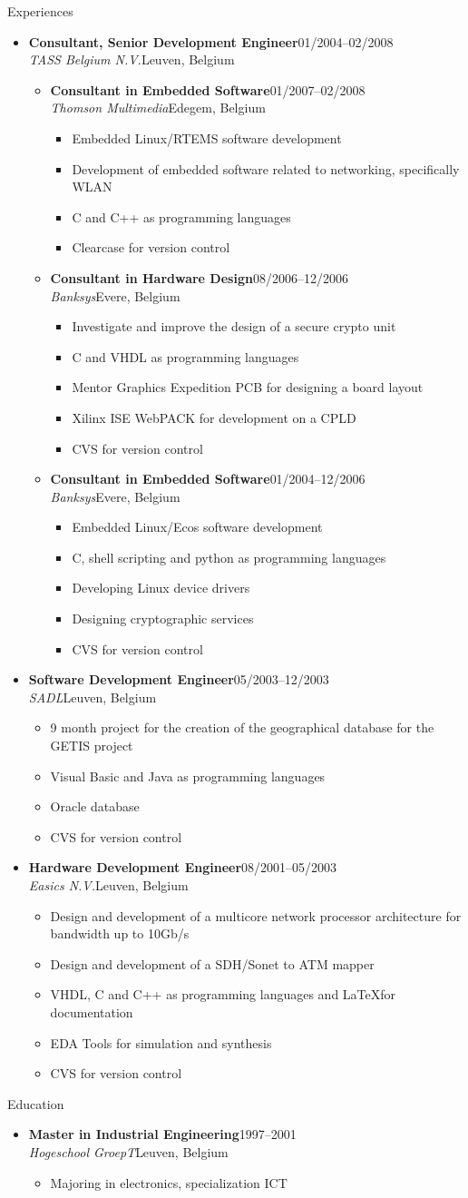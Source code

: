 \documentclass[12pt,oneside]{article}
\newenvironment{ressection}[1]{
	\vspace{5pt}
	{\selectfont\Large#1}
	\begin{itemize}
	\vspace{5pt}
}{
	\end{itemize}
}
\newcommand{\ressubitem}[1]{
	\vspace{-4pt}
	\item \begin{flushleft} #1 \end{flushleft}
}
\newcommand{\resbigitem}[4]{
	\vspace{-5pt}
	\item
	\textbf{#1}\hfill#4 \\
	\textit{#2}\hfill#3
}
\newenvironment{ressubsec}[4]{
	\resbigitem{#1}{#2}{#3}{#4}
	\vspace{-2pt}
	\begin{itemize}
}{
	\end{itemize}
}
\newenvironment{ressubsubsec}[4]{
	\vspace{5pt}
	\resbigitem{#1}{#2}{#3}{#4}
	\begin{itemize}
}{
	\end{itemize}
}
\newcommand{\ressubsubitem}[1]{
	\vspace{-1pt}
	\item \begin{flushleft} #1 \end{flushleft}
}
\begin{document}
\begin{ressection}{Experiences}
\begin{ressubsec}{Consultant, Senior Development Engineer}{TASS Belgium N.V.}{Leuven, Belgium}{01/2004--02/2008}
		\begin{ressubsubsec}{Consultant in Embedded Software}{Thomson Multimedia}{Edegem, Belgium}{01/2007--02/2008}
			\ressubsubitem{Embedded Linux/RTEMS software development}
			\ressubsubitem{Development of embedded software related to networking, specifically WLAN}
			\ressubsubitem{C and C++ as programming languages}
			\ressubsubitem{Clearcase for version control}
		\end{ressubsubsec}
		\begin{ressubsubsec}{Consultant in Hardware Design}{Banksys}{Evere, Belgium}{08/2006--12/2006}
			\ressubsubitem{Investigate and improve the design of a secure crypto unit}
			\ressubsubitem{C and VHDL as programming languages}
			\ressubsubitem{Mentor Graphics Expedition PCB for designing a board layout}
			\ressubsubitem{Xilinx ISE WebPACK for development on a CPLD}
			\ressubsubitem{CVS for version control}
		\end{ressubsubsec}
		\begin{ressubsubsec}{Consultant in Embedded Software}{Banksys}{Evere, Belgium}{01/2004--12/2006}
			\ressubsubitem{Embedded Linux/Ecos software development}
			\ressubsubitem{C, shell scripting and python as programming languages}
			\ressubsubitem{Developing Linux device drivers}
			\ressubsubitem{Designing cryptographic services}
			\ressubsubitem{CVS for version control}
		\end{ressubsubsec}
	\end{ressubsec}
	\begin{ressubsec}{Software Development Engineer}{SADL}{Leuven, Belgium}{05/2003--12/2003}
		\ressubitem{9 month project for the creation of the geographical database for the GETIS project}
		\ressubitem{Visual Basic and Java as programming languages}
		\ressubitem{Oracle database}
		\ressubitem{CVS for version control}
	\end{ressubsec}
	\begin{ressubsec}{Hardware Development Engineer}{Easics N.V.}{Leuven, Belgium}{08/2001--05/2003}
		\ressubitem{Design and development of a multicore network processor architecture for bandwidth up to 10Gb/s}
		\ressubitem{Design and development of a SDH/Sonet to ATM mapper}
		\ressubitem{VHDL, C and C++ as programming languages and \LaTeX for documentation}
		\ressubitem{EDA Tools for simulation and synthesis}
		\ressubitem{CVS for version control}
	\end{ressubsec}
\end{ressection}

\begin{ressection}{Education}
	\begin{ressubsec}{Master in Industrial Engineering}{Hogeschool GroepT}{Leuven, Belgium}{1997--2001}
		\ressubitem{Majoring in electronics, specialization ICT}
	\end{ressubsec}
\end{ressection}
\end{document}
